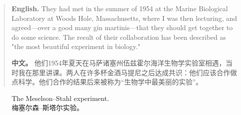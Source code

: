 \begin{quote}
\noindent\textbf{English.} They had met in the summer of 1954 at the Marine Biological Laboratory at Woods Hole, Massachusetts, where I was then lecturing, and agreed---over a good many gin martinis---that they should get together to do some science. The result of their collaboration has been described as "the most beautiful experiment in biology."

\smallskip
\noindent\textbf{中文。} 他们1954年夏天在马萨诸塞州伍兹霍尔海洋生物学实验室相遇，当时我在那里讲课。两人在许多杯金酒马提尼之后达成共识：他们应该合作做点科学。他们合作的结果后来被称为“生物学中最美丽的实验”。
\end{quote}

\begin{figure}[htbp]
\centering
{}
\caption{The Meselson--Stahl experiment.\\梅塞尔森--斯塔尔实验。}
\end{figure}


